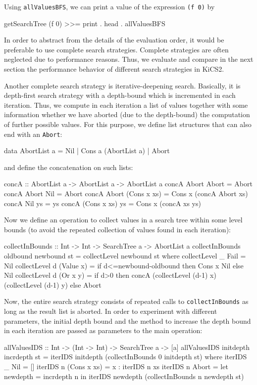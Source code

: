 \documentclass[english]{lni}
\newcommand{\code}[1]{\texttt{\small{}#1}}
\begin{document}
Using \code{allValuesBFS}, we can print a value
of the expression \code{(f 0)} by
\begin{curry}
getSearchTree (f 0) >>= print . head . allValuesBFS
\end{curry}
%
In order to abstract from the details of the evaluation order,
it would be preferable to use complete search strategies.
Complete strategies are often neglected due to performance reasons.
Thus, we evaluate and compare in the next section the
performance behavior of different search strategies in KiCS2.

Another complete search strategy is iterative-deepening search.
Basically, it is depth-first search strategy with a depth-bound
which is incremented in each iteration.
Thus, we compute in each iteration a list of values
together with some information whether we have aborted
(due to the depth-bound) the computation of further possible values.
For this purpose, we define list structures that can also end
with an \code{Abort}:
\begin{curry}
data AbortList a = Nil | Cons a (AbortList a) | Abort
\end{curry}
and define the concatenation on such lists:
\begin{curry}
concA :: AbortList a -> AbortList a -> AbortList a
concA Abort       Abort       = Abort
concA Abort       Nil         = Abort
concA Abort       (Cons x xs) = Cons x (concA Abort xs)
concA Nil         ys          = ys
concA (Cons x xs) ys          = Cons x (concA xs ys)
\end{curry}
Now we define an operation to collect values in a search tree
within some level bounds (to avoid the repeated collection
of values found in each iteration):
\begin{curry}
collectInBounds :: Int -> Int -> SearchTree a -> AbortList a
collectInBounds oldbound newbound st = collectLevel newbound st
 where
  collectLevel _ Fail      = Nil
  collectLevel d (Value x) = if d<=newbound-oldbound then Cons x Nil
                                                     else Nil
  collectLevel d (Or x y)  =
    if d>0 then concA (collectLevel (d-1) x) (collectLevel (d-1) y)
           else Abort
\end{curry}
Now, the entire search strategy consists of
repeated calls to \code{collectInBounds} as long as the result list
is aborted. In order to experiment with different parameters,
the initial depth bound and the method to increase the depth bound
in each iteration are passed as parameters to the main operation:
\begin{curry}
allValuesIDS :: Int -> (Int -> Int) -> SearchTree a -> [a]
allValuesIDS initdepth incrdepth st =
  iterIDS initdepth (collectInBounds 0 initdepth st)
 where
  iterIDS _ Nil = []
  iterIDS n (Cons x xs) = x : iterIDS n xs
  iterIDS n Abort = let newdepth = incrdepth n
                     in iterIDS newdepth (collectInBounds n newdepth st)
\end{curry}
\end{document}
